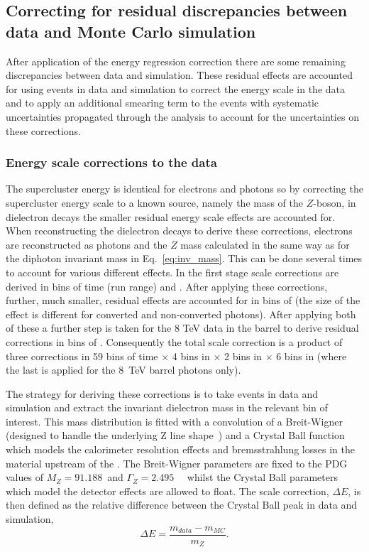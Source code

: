 \subsection{Correcting for residual discrepancies between data and Monte Carlo simulation}
\label{sec:scale_smearing}

After application of the energy regression correction there are some remaining discrepancies between data and \MC simulation. These residual effects are accounted for using \Zee events in data and simulation to correct the energy scale in the data and to apply an additional smearing term to the \MC events with systematic uncertainties propagated through the analysis to account for the uncertainties on these corrections.

\subsubsection{Energy scale corrections to the data}

The supercluster energy is identical for electrons and photons so by correcting the supercluster energy scale to a known source, namely the mass of the $Z$-boson, in dielectron decays the smaller residual energy scale effects are accounted for. When reconstructing the dielectron decays to derive these corrections, electrons are reconstructed as photons and the $Z$ mass calculated in the same way as for the diphoton invariant mass in Eq.~\ref{eq:inv_mass}. This can be done several times to account for various different effects. In the first stage scale corrections are derived in bins of time (run range) and \eta. After applying these corrections, further, much smaller, residual effects are accounted for in bins of \rnine (the size of the effect is different for converted and non-converted photons). After applying both of these a further step is taken for the 8 TeV data in the barrel to derive residual corrections in bins of \ET. Consequently the total scale correction is a product of three corrections in 59 bins of time $\times$ 4 bins in \eta $\times$ 2 bins in \rnine $\times$ 6 bins in \ET (where the last is applied for the 8~TeV barrel photons only).

The strategy for deriving these corrections is to take \Zee events in data and \MC simulation and extract the invariant dielectron mass in the relevant bin of interest. This mass distribution is fitted with a convolution of a Breit-Wigner (designed to handle the underlying Z line shape~\cite{pdg}) and a Crystal Ball function which models the calorimeter resolution effects and bremsstrahlung losses in the material upstream of the \ECAL. The Breit-Wigner parameters are fixed to the PDG values of $M_{Z}=91.188$~\GeV and $\Gamma_{Z}=2.495$~\GeV~\cite{pdg} whilst the Crystal Ball parameters which model the detector effects are allowed to float. The scale correction, $\Delta E$, is then defined as the relative difference between the Crystal Ball peak in data and simulation,
\begin{equation}
  \Delta E = \frac{m_{data}-m_{MC}}{m_{Z}}.
\end{equation}
